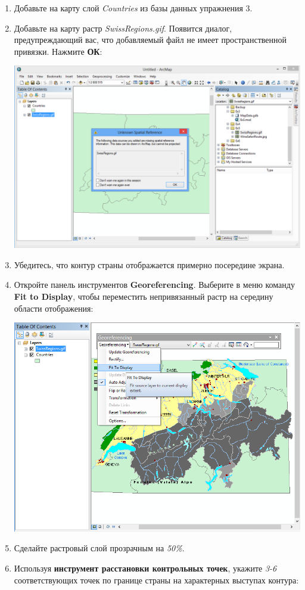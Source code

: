 \documentclass[]{book}
\theoremstyle{definition}
\theoremstyle{definition}
\theoremstyle{definition}
\theoremstyle{remark}
\begin{document}
\begin{enumerate}
\def\labelenumi{\arabic{enumi}.}
\item
  Добавьте на карту слой \emph{Countries} из базы данных упражнения 3.
\item
  Добавьте на карту растр \emph{SwissRegions.gif}. Появится диалог,
  предупреждающий вас, что добавляемый файл не имеет пространственной
  привязки. Нажмите \textbf{ОК}:

  \includegraphics{images/Ex07/image8.png}
\item
  Убедитесь, что контур страны отображается примерно посередине экрана.
\item
  Откройте панель инструментов \textbf{Georeferencing}. Выберите в меню
  команду \textbf{Fit to Display}, чтобы переместить непривязанный растр
  на середину области отображения:

  \includegraphics{images/Ex07/image9.png}
\item
  Сделайте растровый слой прозрачным на \emph{50\%}.
\item
  Используя \textbf{инструмент расстановки контрольных точек}, укажите
  \emph{3-6} соответствующих точек по границе страны на характерных
  выступах контура:


\end{enumerate}
\end{document}
